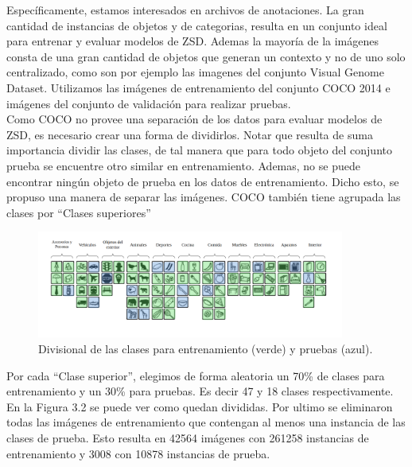 Específicamente, estamos interesados en archivos de anotaciones. La gran cantidad de instancias de objetos y de categorias, resulta en un conjunto ideal para entrenar y evaluar modelos de ZSD. Ademas la mayoría de la imágenes consta de una gran cantidad de objetos que generan un contexto y no de uno solo centralizado, como son por ejemplo las imagenes del conjunto Visual Genome Dataset. Utilizamos las imágenes de entrenamiento del conjunto COCO 2014 e imágenes del conjunto de validación para realizar pruebas.
\\
Como COCO no provee una separación de los datos para evaluar modelos de ZSD, es necesario crear una forma de dividirlos. Notar que resulta de suma importancia dividir las clases, de tal manera que para todo objeto del conjunto prueba se encuentre otro similar en entrenamiento. Ademas, no se puede encontrar ningún objeto de prueba en los datos de entrenamiento. Dicho esto, se propuso una manera de separar las imágenes. COCO también tiene agrupada las clases por ``Clases superiores''
\begin{figure}[H]
	\begin{center}
	\centering
	\includegraphics[width=0.9\textwidth]{img/data_set.png}
	\caption{Divisional de las clases para entrenamiento (verde) y pruebas (azul).}
	\label{fig:data_set}
	\end{center}	
\end{figure}
Por cada ``Clase superior'', elegimos de forma aleatoria un 70\% de clases para entrenamiento y un 30\% para pruebas. Es decir 47 y 18 clases respectivamente. En la Figura 3.2 se puede ver como quedan divididas. Por ultimo se eliminaron todas las imágenes de entrenamiento que contengan al menos una instancia de las clases de prueba. Esto resulta en 42564 imágenes con 261258 instancias de entrenamiento y 3008 con 10878 instancias de prueba.

